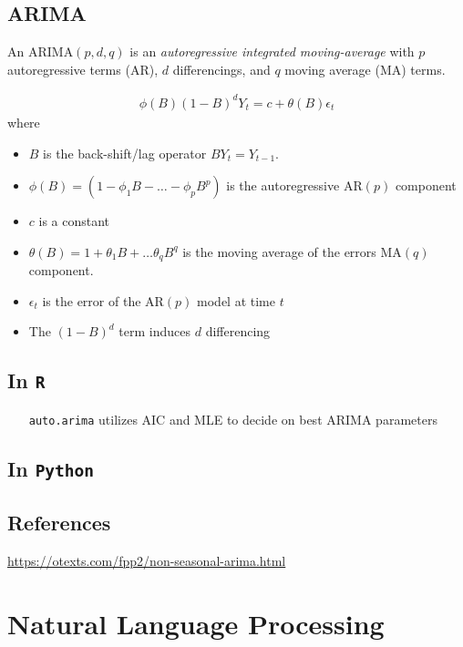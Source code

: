 \documentclass[12pt]{article}
\begin{document}
\subsection{ARIMA}

An $\text{ARIMA}(p,d,q)$ is an {\sl autoregressive integrated moving-average}
with $p$ autoregressive terms (AR), $d$ differencings, and $q$ moving average (MA) terms.

\begin{align*}
  \phi(B) (1-B)^d Y_t = c + \theta(B) \epsilon_t
\end{align*}
where
\begin{itemize}
\item $B$ is the back-shift/lag operator $BY_t = Y_{t-1}$.
\item $\phi(B) = (1 - \phi_1 B - \ldots - \phi_p B^p )$ is the autoregressive
  $\text{AR}(p)$ component
\item $c$ is a constant
\item $\theta(B) =  1 + \theta_1 B + \ldots \theta_q B^q$ is the moving
    average of the errors $\text{MA}(q)$ component.
\item $\epsilon_t$ is the error of the $\text{AR}(p)$ model at time $t$
\item The $(1-B)^d$ term induces $d$ differencing
\end{itemize}




\subsection{In {\tt R}}

\begin{itemize}
\item[{\tt auto.arima}] utilizes AIC and MLE to decide on best ARIMA parameters
\end{itemize}

\subsection{In {\tt Python}}

\subsection{References}

\url{https://otexts.com/fpp2/non-seasonal-arima.html}


\section{Natural Language Processing}
\end{document}
